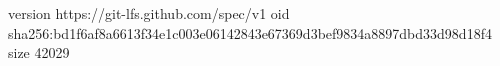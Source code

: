 version https://git-lfs.github.com/spec/v1
oid sha256:bd1f6af8a6613f34e1c003e06142843e67369d3bef9834a8897dbd33d98d18f4
size 42029
